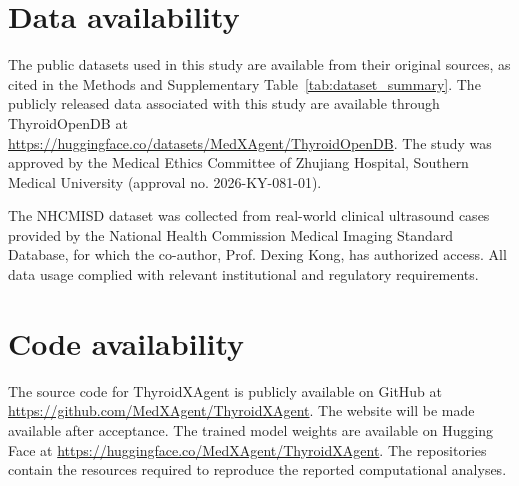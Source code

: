\documentclass[fleqn,10pt]{wlscirep}
\begin{document}
\section{Data availability}
The public datasets used in this study are available from their original sources, as cited in the Methods and Supplementary Table~\ref{tab:dataset_summary}. The publicly released data associated with this study are available through ThyroidOpenDB at \url{https://huggingface.co/datasets/MedXAgent/ThyroidOpenDB}.
The study was approved by the Medical Ethics Committee of Zhujiang Hospital, Southern Medical University (approval no. 2026-KY-081-01).


The NHCMISD dataset was collected from real-world clinical ultrasound cases provided by the National Health Commission Medical Imaging Standard Database, for which the co-author, Prof. Dexing Kong, has authorized access. All data usage complied with relevant institutional and regulatory requirements.


\section{Code availability}
The source code for ThyroidXAgent is publicly available on GitHub at \url{https://github.com/MedXAgent/ThyroidXAgent}. The website will be made available after acceptance. The trained model weights are available on Hugging Face at \url{https://huggingface.co/MedXAgent/ThyroidXAgent}. The repositories contain the resources required to reproduce the reported computational analyses.
\end{document}
